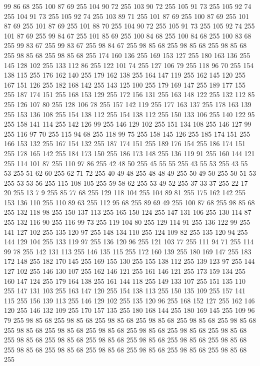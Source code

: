 99 86 68 255 100 87 69 255 104 90 72 255 103 90 72 255 105 91 73 255 105 92 74 255 104 91 73 255 105 92 74 255 103 89 71 255 101 87 69 255 100 87 69 255 101 87 69 255 101 87 69 255 101 88 70 255 104 90 72 255 105 91 73 255 105 92 74 255 101 87 69 255 99 84 67 255 101 85 69 255 100 84 68 255 100 84 68 255 100 83 68 255 99 83 67 255 99 83 67 255 98 84 67 255 98 85 68 255 98 85 68 255 98 85 68 255 98 85 68 255 98 85 68 255 174 160 136 255 169 153 127 255 180 163 136 255 145 128 102 255 133 112 86 255 122 101 74 255 127 106 79 255 118 96 70 255 154 138 115 255 176 162 140 255 179 162 138 255 164 147 119 255 162 145 120 255 167 151 126 255 182 168 142 255 143 125 100 255 179 169 147 255 189 177 155 255 187 174 151 255 168 153 129 255 172 156 131 255 163 148 122 255 132 112 85 255 126 107 80 255 128 106 78 255 157 142 119 255 177 163 137 255 178 163 139 255 153 136 108 255 154 138 112 255 154 138 112 255 150 133 106 255 140 122 95 255
158 141 114 255 142 126 99 255 146 129 102 255 151 134 108 255 146 127 99 255 116 97 70 255 115 94 68 255 118 99 75 255 158 145 126 255 185 174 151 255 166 153 132 255 167 154 132 255 187 174 151 255 189 176 154 255 186 174 151 255 178 165 142 255 184 173 150 255 186 173 148 255 136 119 91 255 160 144 121 255 114 101 87 255 110 97 86 255 42 48 50 255 45 55 55 255 43 55 53 255 43 55 53 255 51 62 60 255 62 71 72 255 40 49 48 255 48 48 49 255 50 49 50 255 50 51 53 255 53 53 56 255 115 108 105 255 59 58 62 255 53 49 52 255 37 33 37 255 22 17 20 255 13 7 9 255 85 77 68 255 129 118 104 255 104 89 81 255 175 162 142 255 153 136 110 255 110 89 63 255 112 95 68 255 89 69 49 255 100 87 68 255 98 85 68 255 132 118 98 255 150 137 113 255 165 150 124 255 147 131 106 255 130 114 87 255 132 116 90 255 116 99 73 255 119 104 80 255 129 114 91 255 136 122 99 255 141 127 102 255 135 120 97 255 148 134 110 255 124 109 82 255 135 120 94 255
144 129 104 255 133 119 97 255 136 120 96 255 121 103 77 255 111 94 71 255 114 99 78 255 142 131 113 255 146 135 115 255 172 160 139 255 180 169 147 255 183 172 148 255 182 170 145 255 169 155 130 255 155 138 112 255 139 123 97 255 144 127 102 255 146 130 107 255 162 146 121 255 161 146 121 255 173 159 134 255 160 147 124 255 179 164 138 255 161 144 118 255 149 133 107 255 151 135 110 255 147 131 103 255 163 147 120 255 154 138 113 255 150 135 109 255 157 141 115 255 156 139 113 255 146 129 102 255 135 120 96 255 168 152 127 255 162 146 120 255 146 132 109 255 170 157 135 255 180 168 144 255 180 169 145 255 109 96 79 255 98 85 68 255 98 85 68 255 98 85 68 255 98 85 68 255 98 85 68 255 98 85 68 255 98 85 68 255 98 85 68 255 98 85 68 255 98 85 68 255 98 85 68 255 98 85 68 255 98 85 68 255 98 85 68 255 98 85 68 255 98 85 68 255 98 85 68 255 98 85 68 255 98 85 68 255 98 85 68 255 98 85 68 255 98 85 68 255 98 85 68 255 98 85 68 255
